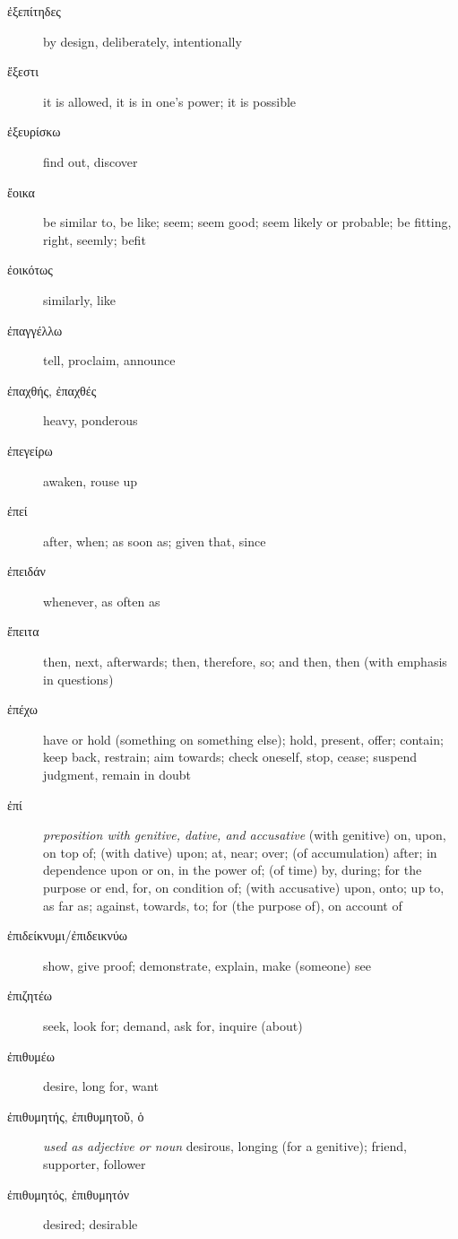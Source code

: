 \documentclass[12pt,letterpaper]{article}
\begin{document}
\begin{description}
    \item[\textgreek{ἐξεπίτηδες}] by design, deliberately, intentionally
    \item[\textgreek{ἔξεστι}] it is allowed, it is in one's power; it is possible
    \item[\textgreek{ἐξευρίσκω}] find out, discover
    \item[\textgreek{ἔοικα}] \marginnote{*}be similar to, be like; seem; seem good; seem likely or probable; be fitting, right, seemly; befit
    \item[\textgreek{ἐοικότως}] similarly, like
    \item[\textgreek{ἐπαγγέλλω}] tell, proclaim, announce
    \item[\textgreek{ἐπαχθής, ἐπαχθές}] heavy, ponderous
    \item[\textgreek{ἐπεγείρω}] awaken, rouse up
    \item[\textgreek{ἐπεί}] \marginnote{*}after, when; as soon as; given that, since
    \item[\textgreek{ἐπειδάν}] whenever, as often as
    \item[\textgreek{ἔπειτα}] \marginnote{*}then, next, afterwards; then, therefore, so; and then, then (with emphasis in questions)
    \item[\textgreek{ἐπέχω}] have or hold (something on something else); hold, present, offer; contain; keep back, restrain; aim towards; check oneself, stop, cease; suspend judgment, remain in doubt
    \item[\textgreek{ἐπί}] \marginnote{*}\textit{preposition with genitive, dative, and accusative} (with genitive) on, upon, on top of; (with dative) upon; at, near; over; (of accumulation) after; in dependence upon or on, in the power of; (of time) by, during; for the purpose or end, for, on condition of; (with accusative) upon, onto; up to, as far as; against, towards, to; for (the purpose of), on account of
    \item[\textgreek{ἐπιδείκνυμι/ἐπιδεικνύω}] show, give proof; demonstrate, explain, make (someone) see
    \item[\textgreek{ἐπιζητέω}] seek, look for; demand, ask for, inquire (about)
    \item[\textgreek{ἐπιθυμέω}] desire, long for, want
    \item[\textgreek{ἐπιθυμητής, ἐπιθυμητοῦ, ὁ}] \textit{used as adjective or noun} desirous, longing (for a genitive); friend, supporter, follower
    \item[\textgreek{ἐπιθυμητός, ἐπιθυμητόν}] desired; desirable

\end{description}
\end{document}
